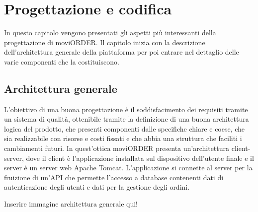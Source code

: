 
\chapter{Progettazione e codifica}
\label{cap:progettazione-codifica}

In questo capitolo vengono presentati gli aspetti più interessanti della progettazione di moviORDER. Il capitolo inizia con la descrizione dell'architettura generale della piattaforma per poi entrare nel dettaglio delle varie componenti che la costituiscono.

\section{Architettura generale}

L'obiettivo di una buona progettazione è il soddisfacimento dei requisiti tramite un sistema di qualità, ottenibile tramite la definizione di una buona architettura logica del prodotto, che presenti componenti dalle specifiche chiare e coese, che sia realizzabile con risorse e costi fissati e che abbia una struttura che faciliti i cambiamenti futuri. In quest'ottica moviORDER presenta un'architettura client-server, dove il client è l'applicazione installata sul dispositivo dell'utente finale e il server è un server web Apache Tomcat. L'applicazione si connette al server per la fruizione di un'API che permette l'accesso a database contenenti dati di autenticazione degli utenti e dati per la gestione degli ordini.

Inserire immagine architettura generale qui!

